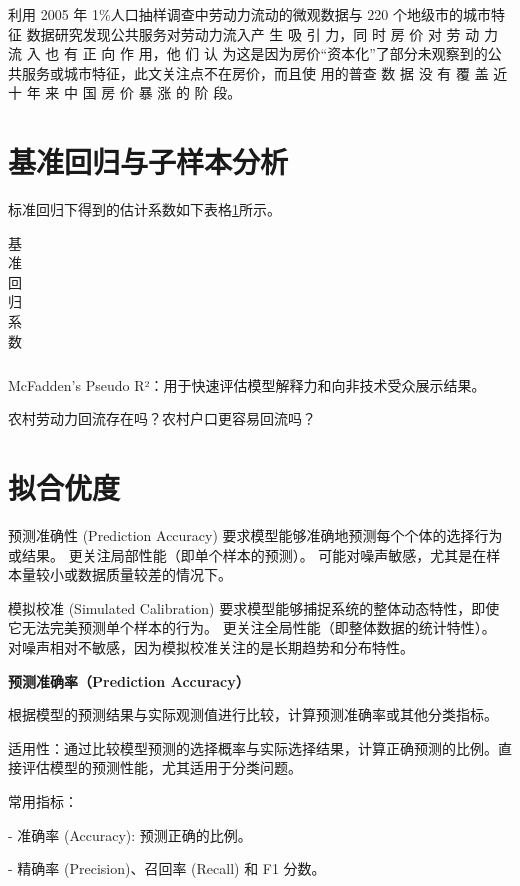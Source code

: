 \documentclass[
  a4paper,
  zihao=-4,
  fontset=mac,
  AutoFakeBold,
  AutoFakeSlant,
  oneside]{ctexbook}
\begin{document}
\textcite{XiaYiRanChengShiJianDeMengMuSanQianGongGongFuWuYingXiangLaoDongLiLiuXiangDeJingYanYanJiu2015} 利用 2005 年 1\%人口抽样调查中劳动力流动的微观数据与 220 个地级市的城市特征 数据研究发现公共服务对劳动力流入产 生 吸 引 力，同 时 房 价 对 劳 动 力 流 入 也 有 正 向 作 用，他 们 认 为这是因为房价“资本化”了部分未观察到的公共服务或城市特征，此文关注点不在房价，而且使 用的普查 数 据 没 有 覆 盖 近 十 年 来 中 国 房 价 暴 涨 的 阶 段。

\section{基准回归与子样本分析} %


标准回归下得到的估计系数如下表格\ref{tab:基准回归系数}所示。
\begin{table}[!ht]
\centering
\caption{基准回归系数}
\begin{tabularx}{\textwidth}{@{}cXXX@{}}
\toprule
\midrule
\bottomrule
\end{tabularx}
\label{tab:基准回归系数}
\end{table}



McFadden’s Pseudo R²：用于快速评估模型解释力和向非技术受众展示结果。


农村劳动力回流存在吗？农村户口更容易回流吗？


\section{拟合优度} 

预测准确性 (Prediction Accuracy) 
要求模型能够准确地预测每个个体的选择行为或结果。
更关注局部性能（即单个样本的预测）。
可能对噪声敏感，尤其是在样本量较小或数据质量较差的情况下。

模拟校准 (Simulated Calibration) 
要求模型能够捕捉系统的整体动态特性，即使它无法完美预测单个样本的行为。
更关注全局性能（即整体数据的统计特性）。
对噪声相对不敏感，因为模拟校准关注的是长期趋势和分布特性。

\textbf{预测准确率（Prediction Accuracy）}

根据模型的预测结果与实际观测值进行比较，计算预测准确率或其他分类指标。

适用性：通过比较模型预测的选择概率与实际选择结果，计算正确预测的比例。直接评估模型的预测性能，尤其适用于分类问题。

常用指标：

- 准确率 (Accuracy): 预测正确的比例。

- 精确率 (Precision)、召回率 (Recall) 和 F1 分数。
\end{document}
